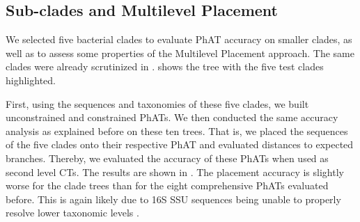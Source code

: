 
\subsection{Sub-clades and Multilevel Placement}
\label{sec:Results:sub:MultilevelPlacement}

We selected five bacterial clades to evaluate \ac{PhAT} accuracy on smaller clades,
as well as to assess some properties of the Multilevel Placement approach.
The same clades were already scrutinized in  \citep{Kozlov2016}.
 shows the  tree with the five test clades highlighted.

First, using the sequences and taxonomies of these five clades, we built unconstrained and constrained \acp{PhAT}.
We then conducted the same accuracy analysis as explained before on these ten trees.
That is, we placed the  sequences of the five clades onto their respective \ac{PhAT}
and evaluated distances to expected branches.
Thereby, we evaluated the accuracy of these \acp{PhAT} when used as second level \aclp{CT}.
The results are shown in .
The placement accuracy is slightly worse for the clade trees than for the eight comprehensive \acp{PhAT} evaluated before.
This is again likely due to 16S SSU sequences being unable to properly resolve lower taxonomic levels \citep{Janda2007}.

